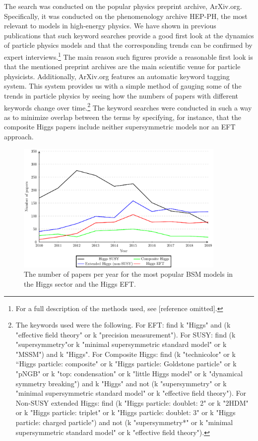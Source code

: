 The search was conducted on the popular physics preprint archive, ArXiv.org.
Specifically, it was conducted on the phenomenology archive HEP-PH, the most relevant to models in high-energy physics.
We have shown in previous publications that such keyword searches provide a good first look at the dynamics of particle physics models and that the corresponding trends can be confirmed by expert interviews.\footnote{For a full description of the methods used, see [reference omitted].}
The main reason such figures provide a reasonable first look is that the mentioned preprint archives are the main scientific venue for particle physicists.
Additionally, ArXiv.org features an automatic keyword tagging system.
This system provides us with a simple method of gauging some of the trends in particle physics by seeing how the numbers of papers with different keywords change over time.\footnote{The keywords used were the following. For EFT: find k "Higgs" and (k "effective field theory" or k "precision measurement"). For SUSY: find (k "supersymmetry"or k "minimal supersymmetric standard model" or k "MSSM") and k "Higgs". For Composite Higgs: find (k "technicolor" or k “Higgs particle: composite" or k "Higgs particle: Goldstone particle" or k "pNGB" or k "top: condensation" or k "little Higgs model" or k "dynamical symmetry breaking") and k "Higgs" and not (k "supersymmetry" or k "minimal supersymmetric standard model" or k "effective field theory"). For Non-SUSY extended Higgs: find (k "Higgs particle: doublet: 2" or k "2HDM" or k "Higgs particle: triplet" or k "Higgs particle: doublet: 3" or k "Higgs particle: charged particle") and not (k "supersymmetry*" or k "minimal supersymmetric standard model" or k "effective field theory").}
The keyword searches were conducted in such a way as to minimize overlap between the terms by specifying, for instance, that the composite Higgs papers include neither supersymmetric models nor an EFT approach. 
\begin{figure}
\includegraphics[width=0.9\textwidth]{susyeft_2107}
\caption{The number of papers per year for the most popular BSM models in the Higgs sector and the Higgs EFT.} 
\label{fig:lineplot}
\end{figure}

